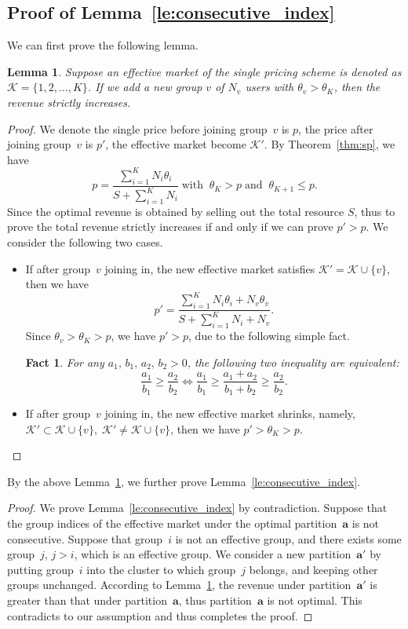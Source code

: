 \documentclass[twocolumn,10pt,twosided]{IEEEtran}
\newtheorem{lemma}{Lemma}
\newtheorem{fact}{Fact}
\begin{document}
\subsection{Proof of Lemma~\ref{le:consecutive_index}}
\label{proof_le:consectutive_index}

We can first prove the following lemma.
\begin{lemma}\label{le:add_one_group}
Suppose an effective market of the single pricing scheme is denoted as $\mathcal{K}=\{1,2,\dots,K\}$. If we add a new group $v$ of $N_v$ users with $\theta_v>\theta_K$, then the revenue strictly
increases.
\end{lemma}
\begin{proof}
We denote the single price before joining group~$v$ is $p$, the
price after joining group~$v$ is $p'$, the effective market become
$\mathcal{K}'$. By Theorem~\ref{thm:sp}, we have
$$p=\frac{\sum_{i=1}^K N_i\theta_i}{S+\sum_{i=1}^KN_i}\; \text{with}\;\;\theta_K>p\;\text{and}\;\;\theta_{K+1}\le p.$$
Since the optimal revenue is obtained by selling out the total
resource $S$, thus to prove the total revenue strictly increases if and only if we can prove $p'>p$. We consider the following two cases.
\begin{itemize}
    \item If after group~$v$ joining in, the new effective market satisfies $\mathcal{K}'=\mathcal{K}\cup \{v\}$, then we have
$$p'=\frac{\sum_{i=1}^K N_i\theta_i+N_v\theta_v}{S+\sum_{i=1}^KN_i+N_v}.$$
Since $\theta_v>\theta_K>p$, we have $p'>p$, due to the following
simple fact.
\begin{fact}
For any $a_1,\,b_1,\,a_2,\,b_2>0$, the following two inequality are
equivalent:
\begin{equation}
\label{eq:simple_fact}
\frac{a_1}{b_1}\ge\frac{a_2}{b_2}\Leftrightarrow
\frac{a_1}{b_1}\ge\frac{a_1+a_2}{b_1+b_2}\ge\frac{a_2}{b_2}.
\end{equation}
\end{fact}
     \item If after group~$v$ joining in, the new effective market shrinks, namely, $\mathcal{K}'\subset \mathcal{K}\cup \{v\},\;\mathcal{K}'\ne \mathcal{K}\cup \{v\}$, then we have $p'>\theta_{K}> p$.
\end{itemize}
\end{proof}

By the above Lemma~\ref{le:add_one_group}, we further prove Lemma~\ref{le:consecutive_index}.
\begin{proof}
We prove Lemma~\ref{le:consecutive_index} by contradiction. Suppose that the group indices of the
effective market under the optimal partition~$\boldsymbol{a}$ is not
consecutive. Suppose that group~$i$ is
not an effective group, and there exists some group~$j$, $j>i$,
which is an effective group. We consider a new
partition~$\boldsymbol{a}'$ by putting group~$i$ into the cluster to
which group~$j$ belongs, and keeping other groups unchanged.
According to Lemma~\ref{le:add_one_group}, the revenue under
partition~$\boldsymbol{a}'$ is greater than that under
partition~$\boldsymbol{a}$, thus partition~$\boldsymbol{a}$ is not optimal.
This contradicts to our assumption and thus completes the proof.
\end{proof}
\end{document}
